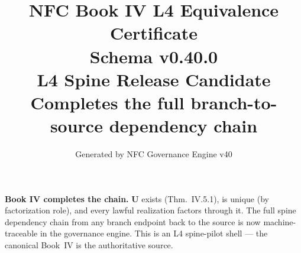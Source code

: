 \documentclass[11pt]{article}
\title{NFC Book IV L4 Equivalence Certificate\\[1ex]\large Schema v0.40.0\\[0.5ex]
\normalsize L4 Spine Release Candidate\\[0.5ex]
\small Completes the full branch-to-source dependency chain}
\author{Generated by NFC Governance Engine v40}
\date{}
\begin{document}
\maketitle
\tableofcontents
\bigskip
\noindent\textbf{Book IV completes the chain.} $\mathbf{U}$ exists (Thm.~IV.5.1),
is unique (by factorization role), and every lawful realization factors through it.
The full spine dependency chain from any branch endpoint back to the source
is now machine-traceable in the governance engine.
This is an L4 spine-pilot shell --- the canonical Book~IV is the authoritative source.
\vspace{1em}

\end{document}
